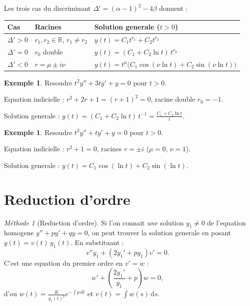 \documentclass[12pt,a4paper,openany]{book}
\theoremstyle{definition}
\newtheorem{exemple}[definition]{Exemple}
\theoremstyle{plain}
\theoremstyle{remark}
\newtheorem{methode}[definition]{Méthode}
\newcommand{\R}{\mathbb{R}}
\newcommand{\dd}{\mathrm{d}}
\begin{document}
Les trois cas du discriminant $\Delta' = (\alpha - 1)^2 - 4\beta$ donnent :

\begin{center}
\renewcommand{\arraystretch}{1.5}
\begin{tabular}{@{}lll@{}}
\toprule
\textbf{Cas} & \textbf{Racines} & \textbf{Solution generale ($t > 0$)} \\
\midrule
$\Delta' > 0$ & $r_1, r_2 \in \R$, $r_1 \neq r_2$ & $y(t) = C_1 t^{r_1} + C_2 t^{r_2}$ \\
$\Delta' = 0$ & $r_0$ double & $y(t) = (C_1 + C_2 \ln t)\, t^{r_0}$ \\
$\Delta' < 0$ & $r = \mu \pm i\nu$ & $y(t) = t^\mu\bigl(C_1 \cos(\nu\ln t) + C_2\sin(\nu\ln t)\bigr)$ \\
\bottomrule
\end{tabular}
\end{center}

\begin{exemple}\label{ex:euler-cauchy-1}
Resoudre $t^2 y'' + 3ty' + y = 0$ pour $t > 0$.

Equation indicielle : $r^2 + 2r + 1 = (r+1)^2 = 0$, racine double $r_0 = -1$.

Solution generale : $y(t) = (C_1 + C_2 \ln t)\, t^{-1} = \frac{C_1 + C_2 \ln t}{t}$.
\end{exemple}

\begin{exemple}\label{ex:euler-cauchy-2}
Resoudre $t^2 y'' + ty' + y = 0$ pour $t > 0$.

Equation indicielle : $r^2 + 1 = 0$, racines $r = \pm i$ ($\mu = 0$, $\nu = 1$).

Solution generale : $y(t) = C_1 \cos(\ln t) + C_2 \sin(\ln t)$.
\end{exemple}

\section{Reduction d'ordre}\label{sec:reduction-ordre}

\begin{methode}[Reduction d'ordre]\label{meth:reduction-ordre}
Si l'on connait \emph{une} solution $y_1 \neq 0$ de l'equation homogene $y'' + py' + qy = 0$, on peut trouver la solution generale en posant $y(t) = v(t)\, y_1(t)$. En substituant :
\[
  v'' y_1 + (2y_1' + py_1)v' = 0.
\]
C'est une equation du premier ordre en $v' = w$ :
\[
  w' + \left(\frac{2y_1'}{y_1} + p\right) w = 0,
\]
d'ou $w(t) = \frac{K}{y_1(t)^2} e^{-\int p\, \dd t}$ et $v(t) = \int w(s)\, \dd s$.
\end{methode}
\end{document}
